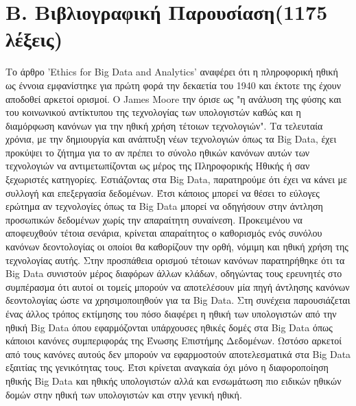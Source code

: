 \documentclass{article}
\begin{document}
\section*{B. Βιβλιογραφική Παρουσίαση(1175 λέξεις)}
Το άρθρο 'Ethics for Big Data
and Analytics' αναφέρει ότι η πληροφορική ηθική ως έννοια εμφανίστηκε για πρώτη φορά την δεκαετία του 1940 και έκτοτε της έχουν αποδοθεί αρκετοί ορισμοί. O James Moore την όρισε ως "η ανάλυση της φύσης και του κοινωνικού αντίκτυπου της τεχνολογίας των υπολογιστών καθώς και η διαμόρφωση κανόνων για την ηθική χρήση τέτοιων τεχνολογιών". Τα τελευταία χρόνια, με την δημιουργία και ανάπτυξη νέων τεχνολογιών όπως τα Big Data, έχει προκύψει το ζήτημα για το αν πρέπει το σύνολο ηθικών κανόνων αυτών των τεχνολογιών να αντιμετωπίζονται ως μέρος της Πληροφορικής Ηθικής ή σαν  ξεχωριστές κατηγορίες. Εστιάζοντας στα Big Data, παρατηρούμε ότι έχει να κάνει με συλλογή και επεξεργασία δεδομένων. Έτσι κάποιος μπορεί να θέσει το εύλογες ερώτημα αν τεχνολογίες όπως τα Big Data μπορεί να οδηγήσουν στην άντληση προσωπικών δεδομένων χωρίς την απαραίτητη συναίνεση. Προκειμένου να αποφευχθούν τέτοια σενάρια, κρίνεται απαραίτητος ο καθορισμός ενός συνόλου κανόνων δεοντολογίας οι οποίοι θα καθορίζουν την ορθή, νόμιμη και ηθική χρήση της τεχνολογίας αυτής. Στην προσπάθεια ορισμού τέτοιων κανόνων παρατηρήθηκε ότι τα Big Data συνιστούν μέρος διαφόρων άλλων κλάδων, οδηγώντας τους ερευνητές στο συμπέρασμα ότι αυτοί οι τομείς μπορούν να αποτελέσουν μία πηγή άντλησης κανόνων δεοντολογίας ώστε να χρησιμοποιηθούν για τα Big Data.  Στη συνέχεια παρουσιάζεται ένας άλλος τρόπος εκτίμησης του πόσο διαφέρει η ηθική των υπολογιστών από την ηθική Big Data όπου εφαρμόζονται υπάρχουσες ηθικές δομές στα Big Data όπως κάποιοι κανόνες συμπεριφοράς της Ένωσης Επιστήμης Δεδομένων. Ωστόσο αρκετοί από τους κανόνες αυτούς δεν μπορούν να εφαρμοστούν αποτελεσματικά στα Big Data εξαιτίας της γενικότητας τους. Έτσι κρίνεται αναγκαία όχι μόνο η διαφοροποίηση ηθικής Big Data και ηθικής υπολογιστών αλλά και ενσωμάτωση πιο ειδικών ηθικών δομών στην ηθική των υπολογιστών και στην γενική ηθική.\newline
\end{document}
